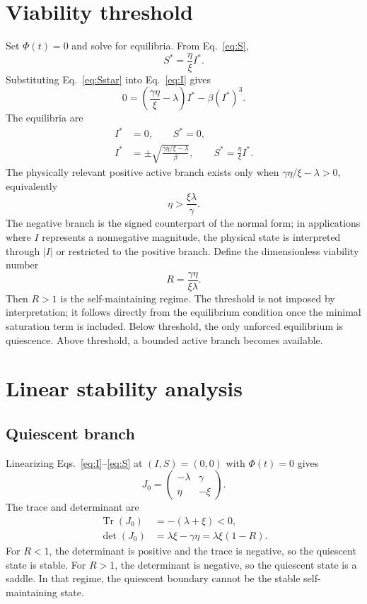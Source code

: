 \documentclass[11pt]{article}
\begin{document}
\section{Viability threshold}
Set $\Phi(t)=0$ and solve for equilibria. From Eq.~\eqref{eq:S},
\begin{equation}
S^*=\frac{\eta}{\xi}I^* . \label{eq:Sstar}
\end{equation}
Substituting Eq.~\eqref{eq:Sstar} into Eq.~\eqref{eq:I} gives
\begin{equation}
0=\left(\frac{\gamma\eta}{\xi}-\lambda\right)I^*-\beta (I^*)^3 . \label{eq:eqcond}
\end{equation}
The equilibria are
\begin{align}
I^*&=0,\qquad S^*=0, \label{eq:zero}\\
I^*&=\pm\sqrt{\frac{\gamma\eta/\xi-\lambda}{\beta}},\qquad S^*=\frac{\eta}{\xi}I^*. \label{eq:active}
\end{align}
The physically relevant positive active branch exists only when $\gamma\eta/\xi-\lambda>0$, equivalently
\begin{equation}
\eta>\frac{\xi\lambda}{\gamma}. \label{eq:threshold}
\end{equation}
The negative branch is the signed counterpart of the normal form; in applications where $I$ represents a nonnegative magnitude, the physical state is interpreted through $|I|$ or restricted to the positive branch. Define the dimensionless viability number
\begin{equation}
R=\frac{\gamma\eta}{\xi\lambda}. \label{eq:R}
\end{equation}
Then $R>1$ is the self-maintaining regime. The threshold is not imposed by interpretation; it follows directly from the equilibrium condition once the minimal saturation term is included. Below threshold, the only unforced equilibrium is quiescence. Above threshold, a bounded active branch becomes available.

\section{Linear stability analysis}
\subsection{Quiescent branch}
Linearizing Eqs.~\eqref{eq:I}--\eqref{eq:S} at $(I,S)=(0,0)$ with $\Phi(t)=0$ gives
\begin{equation}
J_0=\begin{pmatrix}-\lambda & \gamma \\ \eta & -\xi\end{pmatrix}. \label{eq:J0}
\end{equation}
The trace and determinant are
\begin{align}
\operatorname{Tr}(J_0)&=-(\lambda+\xi)<0,\\
\det(J_0)&=\lambda\xi-\gamma\eta=\lambda\xi(1-R). \label{eq:detJ0}
\end{align}
For $R<1$, the determinant is positive and the trace is negative, so the quiescent state is stable. For $R>1$, the determinant is negative, so the quiescent state is a saddle. In that regime, the quiescent boundary cannot be the stable self-maintaining state.
\end{document}
